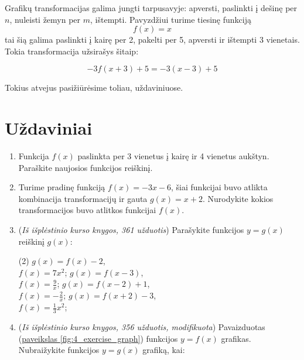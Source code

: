 \documentclass[nobib]{tufte-handout}
\begin{document}
Grafikų transformacijas galima jungti tarpusavyje: apversti, paslinkti į dešinę
per $n$, nuleisti žemyn per $m$, ištempti. Pavyzdžiui turime tiesinę funkciją
$$f(x)=x$$
tai šią galima paslinkti į kairę per 2, pakelti per 5, apversti ir
ištempti 3 vienetais. Tokia transformacija užsirašys šitaip:

$$-3f(x+3)+5=-3(x-3)+5$$

Tokius atvejus pasižiūrėsime toliau, uždaviniuose.
\section{Uždaviniai}\label{sec:exercises}

\begin{enumerate}
  \item Funkcija $f(x)$ paslinkta per 3 vienetus į kairę ir 4 vienetus aukštyn.
        Paraškite naujosios funkcijos reiškinį.
  \item Turime pradinę funkciją $f(x)=-3x-6$, šiai funkcijai buvo atlikta
        kombinacija transformacijų ir gauta $g(x)=x+2$. Nurodykite kokios
        transformacijos buvo atlitkos funkcijai $f(x)$.
  \item (\textit{Iš išplėstinio kurso knygos, 361 užduotis}) Parašykite
        funkcijos $y=g(x)$ reiškinį $g(x)$:

        \begin{tasks}[item-format={\normalfont}, after-item-skip=2mm](2)
          \task $g(x)=f(x)-2$,\\ $f(x)=7x^2$;
          \task $g(x)=f(x-3)$,\\  $f(x)=\frac{9}{x}$;
          \task $g(x)=f(x-2)+1$,\\  $f(x)=-\frac{2}{x}$;
          \task $g(x)=f(x+2)-3$,\\ $f(x)=\frac{1}{3}x^2$;
        \end{tasks}

  \item (\textit{Iš išplėstinio kurso knygos, 356 užduotis, modifikuota})
        Pavaizduotas
        (\hyperref[fig:4_exercise_graph]{paveikslas
          \ref*{fig:4_exercise_graph}})
        funkcijos $y=f(x)$ grafikas. Nubraižykite funkcijos $y=g(x)$ grafiką,
        kai:

        \begin{marginfigure}%


\end{marginfigure}
\end{enumerate}
\end{document}
